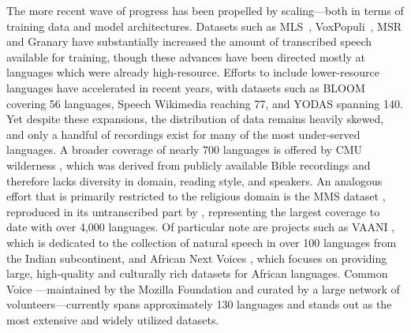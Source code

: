 \documentclass[]{fairmeta}
\begin{document}
The more recent wave of progress has been propelled by scaling—both in terms of training data and model architectures. Datasets such as MLS~\citep{pratap2020mls}, VoxPopuli~\citep{wang2021voxpopuli}, MSR \citep{li2024msr} and Granary \citep{koluguri2025granary} have substantially increased the amount of transcribed speech available for training, though these advances have been directed mostly at languages which were already high-resource. Efforts to include lower-resource languages have accelerated in recent years, with datasets such as BLOOM \citep{leong2022bloom} covering 56 languages, Speech Wikimedia \citep{gomez2023speech} reaching 77, and YODAS \citep{li2023yodas} spanning 140. Yet despite these expansions, the distribution of data remains heavily skewed, and only a handful of recordings exist for many of the most under-served languages. A broader coverage of nearly 700 languages is offered by CMU wilderness \citep{black2019cmu}, which was derived from publicly available Bible recordings and therefore lacks diversity in domain, reading style, and speakers. An analogous effort that is primarily restricted to the religious domain is the MMS dataset \citep{pratap2024scaling}, reproduced in its untranscribed part by \citet{chen2024robustspeechrepresentationlearning}, representing the largest coverage to date with over 4,000 languages. Of particular note are projects such as VAANI \citep{vaani2025}, which is dedicated to the collection of natural speech in over 100 languages from the Indian subcontinent, and African Next Voices \citep{anv-za,anv-ke,anv-et-amh,anv-et-sid,anv-et-wal,anv-et-tig,anv-et-orm}, which focuses on providing large, high-quality and culturally rich datasets for African languages. Common Voice \citep{ardila2020common}—maintained by the Mozilla Foundation and curated by a large network of volunteers—currently spans approximately 130 languages and stands out as the most extensive and widely utilized datasets.
\end{document}
